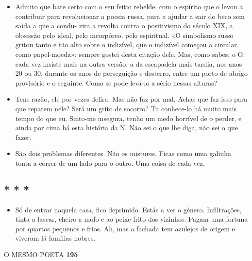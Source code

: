\begin{itemize}
\tightlist
\item
  Admito que bate certo com o seu feitio rebelde, com o espírito que o
  levou a contribuir para revolucionar a poesia russa, para a ajudar a
  sair do beco sem saída a que a condu- zira a revolta contra o
  positivismo do século XIX, a obsessão pelo ideal, pelo incorpóreo,
  pelo espiritual. «O simbolismo russo gritou tanto e tão alto sobre o
  indizível, que o indizível começou a circular como papel-moeda»:
  sempre gostei desta citação dele. Mas, como sabes, o O. cada vez
  insiste mais na outra versão, a da escapadela mais tardia, nos anos 20
  ou 30, durante os anos de perseguição e desterro, entre um porto de
  abrigo provisório e o seguinte. Como se pode levá-lo a sério nessas
  alturas?
\item
  Tens razão, ele por vezes delira. Mas não faz por mal. Achas que faz
  isso para que reparem nele? Será um grito de socorro? Tu conhece-lo há
  muito mais tempo do que eu. Sinto-me insegura, tenho um medo horrível
  de o perder, e ainda por cima há esta história da N. Não sei o que lhe
  diga, não sei o que fazer.
\item
  São dois problemas diferentes. Não os mistures. Ficas como uma galinha
  tonta a correr de um lado para o outro. Uma coisa de cada vez.
\end{itemize}

\subsection{* * *}

\begin{itemize}
\tightlist
\item
  Só de entrar naquela casa, fico deprimido. Estás a ver o género.
  Infiltrações, tinta a lascar, cheiro a mofo e ao peixe frito dos
  vizinhos. Pagam uma fortuna por quartos pequenos e frios. Ah, mas a
  fachada tem azulejos de origem e viveram lá famílias nobres.
\end{itemize}

O MESMO POETA \textbf{195}

